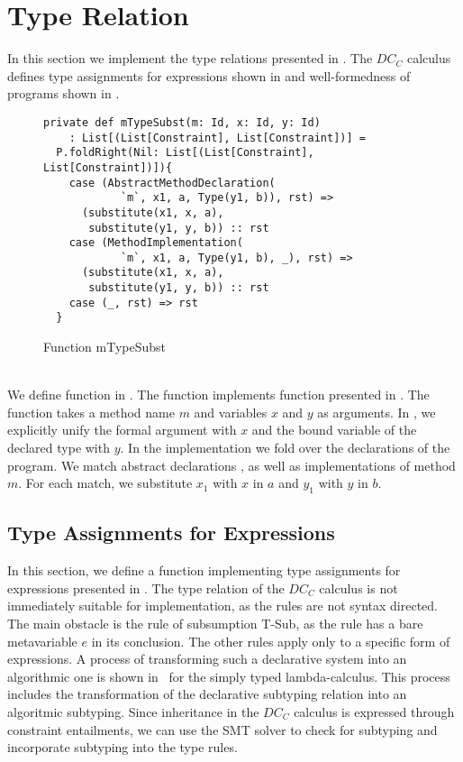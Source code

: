 \section{Type Relation}
In this section we implement the type relations presented in .
The $DC_C$ calculus defines type assignments for expressions
shown in 
and well-formedness of programs shown in .
%
\begin{figure}[h]
\begin{lstlisting}
private def mTypeSubst(m: Id, x: Id, y: Id)
    : List[(List[Constraint], List[Constraint])] =
  P.foldRight(Nil: List[(List[Constraint], List[Constraint])]){
    case (AbstractMethodDeclaration(
            `m`, x1, a, Type(y1, b)), rst) =>
      (substitute(x1, x, a),
       substitute(y1, y, b)) :: rst
    case (MethodImplementation(
            `m`, x1, a, Type(y1, b), _), rst) =>
      (substitute(x1, x, a),
       substitute(y1, y, b)) :: rst
    case (_, rst) => rst
  }
\end{lstlisting}
\caption{Function mTypeSubst}
\label{fig:scala-mtype}
\end{figure}\\
We define function  in .
The function implements function 
presented in .
The function takes a method name $m$ and
variables $x$ and $y$ as arguments.
In , we explicitly unify the formal argument
with $x$ and the bound variable of the declared type with $y$.
In the implementation we fold over the declarations of the program.
We match abstract declarations ,
as well as implementations  of method $m$.
For each match, we substitute $x_1$ with $x$ in $a$ and $y_1$ with $y$ in $b$.


\subsection{Type Assignments for Expressions}
\label{sec:typeass}
In this section, we define a function 
implementing type assignments for expressions presented in .
The type relation of the $DC_C$ calculus is not immediately suitable for implementation,
as the rules are not syntax directed.
The main obstacle is the rule of subsumption T-Sub,
as the rule has a bare metavariable $e$ in its conclusion.
The other rules apply only to a specific form of expressions.
A process of transforming such a declarative system into an algorithmic one
is shown in~\cite{tpl} for the simply typed lambda-calculus.
This process includes the transformation of the declarative subtyping relation
into an algoritmic subtyping.
Since inheritance in the $DC_C$ calculus is expressed through constraint entailments,
we can use the SMT solver to check for subtyping
and incorporate subtyping into the type rules.


